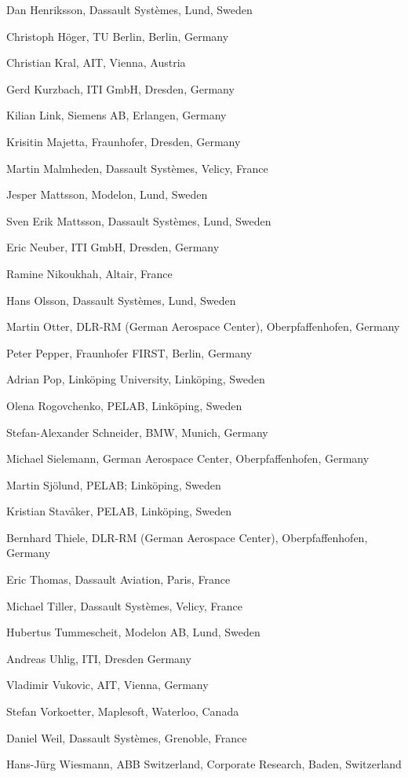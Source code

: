 Dan Henriksson, Dassault Systèmes, Lund, Sweden

Christoph Höger, TU Berlin, Berlin, Germany

Christian Kral, AIT, Vienna, Austria

Gerd Kurzbach, ITI GmbH, Dresden, Germany

Kilian Link, Siemens AB, Erlangen, Germany

Krisitin Majetta, Fraunhofer, Dresden, Germany

Martin Malmheden, Dassault Systèmes, Velicy, France

Jesper Mattsson, Modelon, Lund, Sweden

Sven Erik Mattsson, Dassault Systèmes, Lund, Sweden

Eric Neuber, ITI GmbH, Dresden, Germany

Ramine Nikoukhah, Altair, France

Hans Olsson, Dassault Systèmes, Lund, Sweden

Martin Otter, DLR-RM (German Aerospace Center), Oberpfaffenhofen,
Germany

Peter Pepper, Fraunhofer FIRST, Berlin, Germany

Adrian Pop, Linköping University, Linköping, Sweden

Olena Rogovchenko, PELAB, Linköping, Sweden

Stefan-Alexander Schneider, BMW, Munich, Germany

Michael Sielemann, German Aerospace Center, Oberpfaffenhofen, Germany

Martin Sjölund, PELAB; Linköping, Sweden

Kristian Stavåker, PELAB, Linköping, Sweden

Bernhard Thiele, DLR-RM (German Aerospace Center), Oberpfaffenhofen,
Germany

Eric Thomas, Dassault Aviation, Paris, France

Michael Tiller, Dassault Systèmes, Velicy, France

Hubertus Tummescheit, Modelon AB, Lund, Sweden

Andreas Uhlig, ITI, Dresden Germany

Vladimir Vukovic, AIT, Vienna, Germany

Stefan Vorkoetter, Maplesoft, Waterloo, Canada

Daniel Weil, Dassault Systèmes, Grenoble, France

Hans-Jürg Wiesmann, ABB Switzerland, Corporate Research, Baden,
Switzerland

